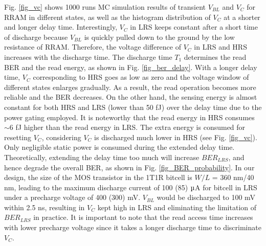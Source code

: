 Fig. \ref{fig_vc} shows 1000 runs MC simulation results of transient $V_{BL}$ and $V_C$ for RRAM in different states, as well as the histogram distribution of $V_C$ at a shorter and longer delay time.
Interestingly, $V_C$ in LRS keeps constant after a short time of discharge because $V_{BL}$ is quickly pulled down to the ground by the low resistance of RRAM. Therefore, the voltage difference of $V_C$ in LRS and HRS increases with the discharge time. 
The discharge time $T_1$ determines the read BER and the read energy, as shown in Fig. \ref{fig_ber_delay}. With a longer delay time, $V_C$ corresponding to HRS goes as low as zero and the voltage window of different states enlarges gradually. As a result, the read operation becomes more reliable and the BER decreases. On the other hand, the sensing energy is almost constant for both HRS and LRS (lower than 50 fJ) over the delay time due to the power gating employed. It is noteworthy that the read energy in HRS consumes $\sim 6$ fJ higher than the read energy in LRS. The extra energy is consumed for resetting $V_C$, considering $V_C$ is discharged much lower in HRS (see Fig. \ref{fig_vc}).
Only negligible static power is consumed during the extended delay time.
Theoretically, extending the delay time too much will increase $BER_{LRS}$, and hence degrade the overall BER, as shown in Fig. \ref{fig_BER_probability}. 
In our design, the size of the MOS transistor in the 1T1R bitcell is $W/L$ = 360 nm/40 nm, leading to the maximum discharge current of 100 (85) $\rm \micro$A for bitcell in LRS under a precharge voltage of 400 (300) mV. $V_{BL}$ would be discharged to 100 mV within 2.5 ns, resulting in $V_C$ kept high in LRS and eliminating the limitation of $BER_{LRS}$ in practice. It is important to note that the read access time increases with lower precharge voltage since it takes a longer discharge time to discriminate $V_C$.

